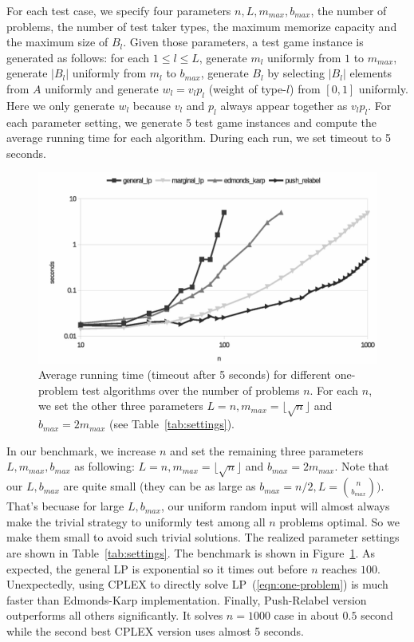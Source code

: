 \documentclass{article}
\begin{document}
For each test case, we specify four parameters $n, L, m_{max}, b_{max}$,
the number of problems, the number of test taker types, the maximum memorize
capacity and the maximum size of $B_l$. Given those parameters, a test game
instance is generated as follows: for each $1 \leq l \leq L$, generate $m_l$
uniformly from $1$ to $m_{max}$, generate $|B_l|$ uniformly from $m_l$ to
$b_{max}$, generate $B_l$ by selecting $|B_l|$ elements from $A$ uniformly and
generate $w_l = v_l p_l$ (weight of type-$l$) from $[0,1]$ uniformly. Here we
only generate $w_l$ because $v_l$ and $p_l$ always appear together as $v_l
p_l$. For each parameter setting, we generate $5$ test game instances and
compute the average running time for each algorithm. During each run, we set
timeout to 5 seconds. 

\begin{figure}
	\caption{Average running time (timeout after 5 seconds) for different
	one-problem test algorithms over the number of problems $n$. For each
	$n$, we set the other three parameters $L = n, m_{max} = \lfloor
	\sqrt{n} \rfloor$ and $b_{max} = 2m_{max}$ (see
	Table~\ref{tab:settings}).}
	\label{fig:benchmark}
	\includegraphics[trim=0 10mm 0 -5mm, clip, width=\linewidth]{benchmark_all}
\end{figure}

In our benchmark, we increase $n$ and set the remaining three parameters $L,
m_{max}, b_{max}$ as following: $L = n, m_{max} = \lfloor \sqrt{n} \rfloor$ and
$b_{max} = 2m_{max}$. Note that our $L, b_{max}$ are quite small (they can be
as large as $b_{max} = n/2, L = \binom{n}{b_{max}})$. That's becuase for large
$L, b_{max}$, our uniform random input will almost always make the trivial
strategy to uniformly test among all $n$ problems optimal. So we make them
small to avoid such trivial solutions. The realized parameter settings are
shown in Table~\ref{tab:settings}. The benchmark is shown in
Figure~\ref{fig:benchmark}.  As expected, the general LP is exponential so it
times out before $n$ reaches $100$.  Unexpectedly, using CPLEX to directly
solve LP~(\ref{eqn:one-problem}) is much faster than Edmonds-Karp
implementation. Finally, Push-Relabel version outperforms all others
significantly. It solves $n=1000$ case in about $0.5$ second while the second
best CPLEX version uses almost 5 seconds.
\end{document}
